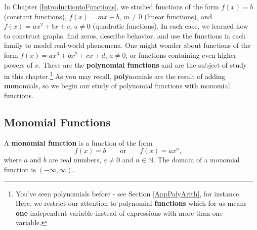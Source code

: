 \documentclass{ximera}
\begin{document}
	\author{Stitz-Zeager}




\setcounter{footnote}{0}

\label{GraphsofPolynomials}

In Chapter \ref{IntroductiontoFunctions}, we studied functions of the form $f(x) = b$ (constant functions), $f(x) = mx+b$, $m \neq 0$ (linear functions), and $f(x) = ax^2+bx+c$, $a \neq 0$ (quadratic functions).  In each case, we learned how to construct graphs, find zeros, describe behavior, and use the functions in each family to model real-world phenomena.  One might wonder about functions of the form $f(x) = ax^3+bx^2+cx+d$, $a \neq 0$, or functions containing even higher powers of $x$.  These are the \textbf{polynomial functions} and are the subject of study in this chapter.\footnote{You've seen polynomials before - see Section \ref{AppPolyArith}, for instance.  Here, we restrict our attention to polynomial \textbf{functions} which for us means \textbf{one} independent variable instead of expressions with more than one variable.}  As you may recall, \textbf{poly}nomials  are the result of adding   \textbf{mon}omials, so we begin our study of polynomial functions with monomial functions.  

\subsection{Monomial Functions}
\label{MonomialFunctions}


\begin{definition} \label{monomialfunction} A \textbf{monomial function} is a function of the form \[  f(x) = b \qquad \text{or} \qquad f(x) = a x^{n},\] where $a$ and $b$ are real numbers, $a \neq 0$ and  $n \in \mathbb{N}$.  The domain of a monomial function is $(-\infty, \infty)$.

\end{definition}


\end{document}
